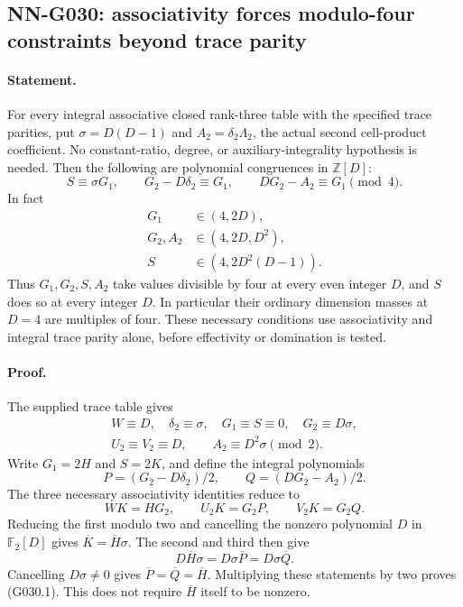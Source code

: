 \subsection{NN-G030: associativity forces modulo-four constraints beyond trace parity}
\paragraph{Statement.}
For every integral associative closed rank-three table with
the specified trace parities, put $\sigma=D(D-1)$ and
$A_2=\delta_2\Lambda_2$, the actual second cell-product
coefficient. No constant-ratio, degree, or auxiliary-integrality
hypothesis is needed. Then the following are polynomial
congruences in $\mathbb Z[D]$:
\[
 S\equiv\sigma G_1,\qquad
 G_2-D\delta_2\equiv G_1,\qquad
 DG_2-A_2\equiv G_1\pmod4.                           \tag{G030.1}
\]
In fact
\[
 \begin{aligned}
 G_1&\in(4,2D),\\
 G_2,A_2&\in(4,2D,D^2),\\
 S&\in(4,2D^2(D-1)).
 \end{aligned}                                                       \tag{G030.2}
\]
Thus $G_1,G_2,S,A_2$ take values divisible by four
at every even integer $D$, and $S$ does so at every
integer $D$. In particular their ordinary dimension
masses at $D=4$ are multiples of four.
These necessary conditions use associativity and
integral trace parity alone, before effectivity or
domination is tested.

\paragraph{Proof.}
The supplied trace table gives
\[
 \begin{gathered}
 W\equiv D,\quad\delta_2\equiv\sigma,\quad
 G_1\equiv S\equiv0,\quad G_2\equiv D\sigma,\\
 U_2\equiv V_2\equiv D,\qquad A_2\equiv D^2\sigma
       \pmod2.
 \end{gathered}
\]
Write $G_1=2H$ and $S=2K$, and define the integral
polynomials
\[
 P=(G_2-D\delta_2)/2,\qquad
 Q=(DG_2-A_2)/2.
\]
The three necessary associativity identities reduce to
\[
 WK=HG_2,\qquad U_2K=G_2P,\qquad V_2K=G_2Q.
\]
Reducing the first modulo two and cancelling the
nonzero polynomial $D$ in $\mathbb F_2[D]$ gives
$\overline K=\overline H\sigma$.
The second and third then give
\[
 D\overline H\sigma=D\sigma\overline P
                       =D\sigma\overline Q.
\]
Cancelling $D\sigma\ne0$ gives
$\overline P=\overline Q=\overline H$.
Multiplying these statements by two proves (G030.1).
This does not require $\overline H$ itself to be nonzero.

